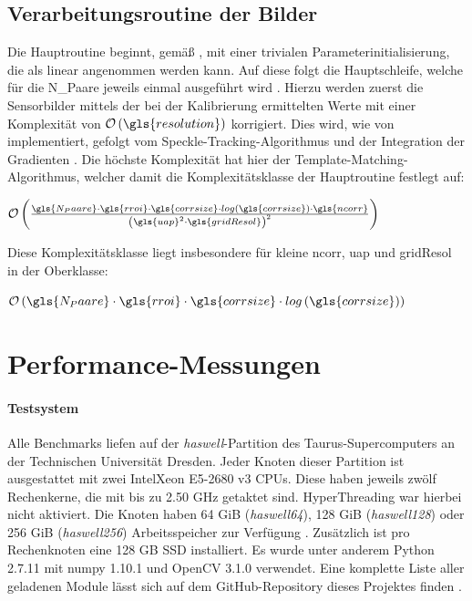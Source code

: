 \subsection{Verarbeitungsroutine der Bilder}

Die Hauptroutine beginnt, gemäß \cite{Coj17}, mit einer trivialen Parameterinitialisierung, die als linear angenommen werden kann. Auf diese folgt die Hauptschleife, welche für die \gls{N_Paare} jeweils einmal ausgeführt wird \cite{Coj17}. Hierzu werden zuerst die Sensorbilder mittels der bei der Kalibrierung ermittelten Werte mit einer Komplexität von $\mathcal{O}\left(\gls{resolution}\right)$ korrigiert. Dies wird, wie von \citeauthor{Coj17} implementiert, gefolgt vom Speckle-Tracking-Algorithmus und der Integration der Gradienten \cite{Coj17}. Die höchste Komplexität hat hier der Template-Matching-Algorithmus, welcher damit die Komplexitätsklasse der Hauptroutine festlegt auf:

\begin{center}
	$\mathcal{O}\left(\frac{\gls{N_Paare} \cdot\gls{rroi} \cdot \gls{corrsize} \cdot log\left(\gls{corrsize}\right) \cdot \gls{ncorr}}{\left(\gls{uap}^2 \cdot \gls{gridResol}\right)^2}\right)$
\end{center}

Diese Komplexitätsklasse liegt insbesondere für kleine \gls{ncorr}, \gls{uap} und \gls{gridResol} in der Oberklasse:

\begin{center}
	$\mathcal{O}\left(\gls{N_Paare} \cdot \gls{rroi} \cdot \gls{corrsize} \cdot log\left(\gls{corrsize}\right)\right)$
\end{center}

\section{Performance-Messungen}

\paragraph{Testsystem}

\begin{sloppypar}
Alle Benchmarks liefen auf der \textit{haswell}-Partition des Taurus-Supercomputers an der Technischen Universität Dresden. Jeder Knoten dieser Partition ist ausgestattet mit zwei Intel\textregistered \mbox{Xeon\textregistered} E5-2680 v3 \glspl{CPU}. Diese haben jeweils zwölf Rechenkerne, die mit bis zu 2.50 \gls{GHz} getaktet sind. HyperThreading war hierbei nicht aktiviert. Die Knoten haben 64 \gls{GiB} (\textit{haswell64}), 128 \gls{GiB} (\textit{haswell128}) oder 256 \gls{GiB} (\textit{haswell256}) Arbeitsspeicher zur Verfügung \cite{Mar17}. Zusätzlich ist pro Rechenknoten eine 128 \gls{GB} \gls{SSD} installiert. Es wurde unter anderem Python 2.7.11 mit numpy 1.10.1 und OpenCV 3.1.0 verwendet. Eine komplette Liste aller geladenen Module lässt sich auf dem GitHub-Repository dieses Projektes finden \cite{Sch18a}.
\end{sloppypar}

